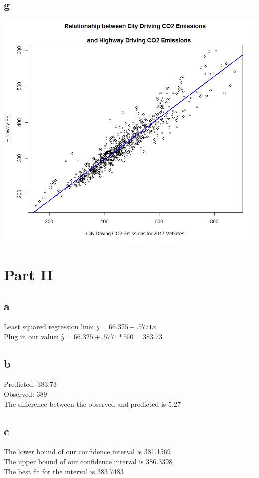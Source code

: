 \documentclass[10pt,letterpaper]{article}
\begin{document}
\subsection*{g}
\includegraphics[scale=.6]{relationship}

\section*{Part II}
\subsection*{a}
Least squared regression line: $\hat{y} = 66.325+.5771x$\\
Plug in our value: $\hat{y} = 66.325 + .5771 * 550 = 383.73$

\subsection*{b}
Predicted: $383.73$\\
Observed: $389$\\
The difference between the observed and predicted is $5.27$

\subsection*{c}
The lower bound of our confidence interval is 381.1569\\
The upper bound of our confidence interval is 386.3398\\
The best fit for the interval is 383.7483\\
\end{document}
